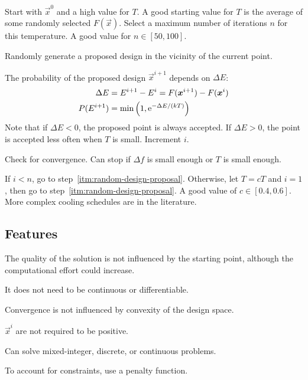 \documentclass{article}
\begin{document}
\begin{enumerate*}
\item Start with \(\vec{x}^0\) and a high value for \(T\). A good starting value
  for \(T\) is the average of some randomly selected \(F(\vec{x})\). Select a
  maximum number of iterations \(n\) for this temperature. A good value for \(n \in [50, 100]\).
\item \label{itm:random-design-proposal} Randomly generate a proposed design in the vicinity of the current point.
\item The probability of the proposed design \(\vec{x}^{i+1}\) depends on \(\Delta E\):
\begin{align*}
  \Delta E &= E^{i+1} - E^{i} = F(\bm{x}^{i+1}) - F(\bm{x}^i) \\
  P(E^{i+1}) &= \min\left(1, \mathrm{e}^{-\Delta E/(kT)}\right)
\end{align*}
Note that if \(\Delta E < 0\), the proposed point is always accepted. If \(\Delta E > 0\),
the point is accepted less often when \(T\) is small. Increment \(i\).
\item Check for convergence. Can stop if \(\Delta f\) is small enough or \(T\) is small enough.
\item If \(i < n\), go to step~\ref{itm:random-design-proposal}. Otherwise, let
  \(T = cT\) and \(i = 1\), then go to step~\ref{itm:random-design-proposal}. A
  good value of \(c \in [0.4, 0.6]\). More complex cooling schedules are in the literature.
\end{enumerate*}

\subsection*{Features}

\begin{itemize*}
\item The quality of the solution is not influenced by the starting point,
  although the computational effort could increase.
\item It does not need to be continuous or differentiable.
\item Convergence is not influenced by convexity of the design space.
\item \(\vec{x}^i\) are not required to be positive.
\item Can solve mixed-integer, discrete, or continuous problems.
\item To account for constraints, use a penalty function.
\end{itemize*}
\end{document}
